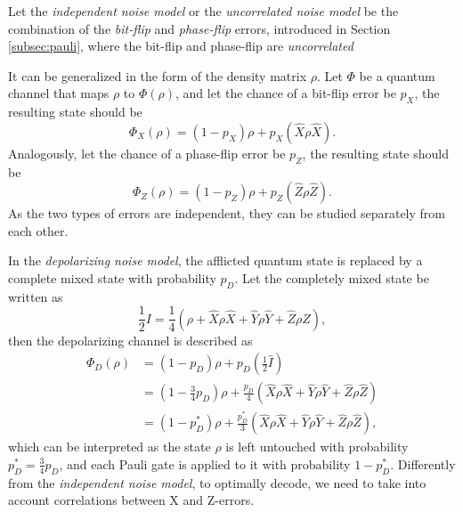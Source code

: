 \begin{definition}\label{def:independent}
  Let the \emph{independent noise model} or the \emph{uncorrelated noise model} be the combination of the \emph{bit-flip} and \emph{phase-flip} errors, introduced in Section \ref{subsec:pauli}, where the bit-flip and phase-flip are \emph{uncorrelated}

  It can be generalized in the form of the density matrix $\rho$. Let $\Phi$ be a quantum channel that maps $\rho$ to $\Phi(\rho)$, and let the chance of a bit-flip error be $p_X$, the resulting state should be
  \begin{equation}\label{qec:eq:bitflip}
    \Phi_X(\rho) = (1-p_X)\rho + p_X(\hat{X}\rho \hat{X}).
  \end{equation}
  Analogously, let the chance of a phase-flip error be $p_Z$, the resulting state should be
  \begin{equation}\label{qec:eq:phaseflip}
    \Phi_Z(\rho) = (1-p_Z)\rho + p_Z(\hat{Z}\rho \hat{Z}).
  \end{equation}
  As the two types of errors are independent, they can be studied separately from each other.
\end{definition}

\begin{definition}\label{def:depolarizing}
  In the \emph{depolarizing noise model}, the afflicted quantum state is replaced by a complete mixed state with probability $p_D$. Let the completely mixed state be written as
  \begin{equation}\label{qec:eq:mixstate}
    \frac{1}{2}I = \frac{1}{4}(\rho + \hat{X}\rho \hat{X} + \hat{Y}\rho \hat{Y} + \hat{Z}\rho \hat{Z}),
  \end{equation}
  then the depolarizing channel is described as
  \begin{align}\label{qec:eq:depolarizing}
    \nonumber \Phi_D(\rho) &= (1-p_D)\rho + p_D\left(\frac{1}{2}\hat{I}\right) \\
    \nonumber &= \left(1-\frac{3}{4}p_D\right)\rho + \frac{p_D}{4}(\hat{X}\rho \hat{X} + \hat{Y}\rho \hat{Y} + \hat{Z}\rho \hat{Z}) \\
    &= (1-p^*_D)\rho + \frac{p^*_D}{3}(\hat{X}\rho \hat{X} + \hat{Y}\rho \hat{Y} + \hat{Z}\rho \hat{Z}),
  \end{align}
  which can be interpreted as the state $\rho$ is left untouched with probability $p^*_D =\frac{3}{4}p_D$, and each Pauli gate is applied to it with probability $1-p^*_D$. Differently from the \emph{independent noise model}, to optimally decode, we need to take into account correlations between X and Z-errors.
\end{definition}

